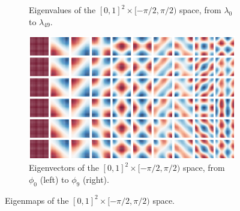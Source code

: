 \documentclass{article}
\begin{document}
\begin{figure}[h!] 
    \centering
    \begin{subfigure}[b]{0.9\textwidth}
        \centering
        \caption{Eigenvalues of the $[0,1]^2 \times [-\pi/2, \pi/2)$ space, from $\lambda_0$ to $\lambda_{49}$.}
    \end{subfigure}
    \hfill
    \begin{subfigure}[b]{\textwidth}
        \centering
        \includegraphics[width=\textwidth]{Images/se2_eigenvecs.png}
        \caption{Eigenvectors of the $[0,1]^2 \times [-\pi/2, \pi/2)$ space, from $\phi_0$ (left) to $\phi_9$ (right).}
    \end{subfigure}
    \caption{Eigenmaps of the $[0,1]^2 \times [-\pi/2, \pi/2)$ space.}
    \label{fig:se2_eigenmaps}
\end{figure}
\end{document}

